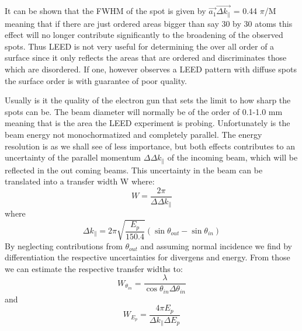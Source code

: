 \vspace{1cm}

 It can be shown that the FWHM of the spot is given by 
$\overrightarrow{a_1} \overrightarrow{\Delta k_{\parallel}}$ = 0.44 $\pi$/M meaning that if there are just ordered areas bigger than say 30 by 30 atoms this effect will no longer contribute significantly  to the  broadening of the observed spots. Thus LEED is not very useful for determining the over all order of a surface since it only reflects the areas that are ordered and discriminates those which are disordered. If one, however observes a LEED pattern with diffuse spots the surface order is with guarantee of poor quality.

Usually is it the quality of the electron gun that sets the limit to how sharp the spots can be. The beam diameter will normally be of the order of 0.1-1.0 mm meaning that is the area the LEED experiment is probing. Unfortunately is the beam energy not monochormatized and completely parallel. The energy resolution is as we shall see of less importance, but both effects contributes to an uncertainty of the parallel momentum $\Delta \Delta k_{\parallel}$  of the incoming beam, which will be reflected in the out coming beams. This uncertainty in the beam can be translated into a transfer width W where:
\begin{equation}
W = \frac{2\pi}{\Delta \Delta k_{\parallel}}
\end{equation} 
where 
\begin{equation}
\Delta k_{\parallel} = 2\pi \sqrt{\frac{E_p}{150.4}}(\sin{\theta_{out}}-\sin{\theta_{in}})
\end{equation} 
By neglecting contributions from $\theta_{out}$ and assuming normal incidence we find by differentiation the respective uncertainties for divergens and energy. From those we can estimate the respective transfer widths to:
\begin{equation}
W_{\theta_{in}} = \frac{\lambda}{\cos{\theta_{in}}\Delta\theta_{in}}
\end{equation}
and 
 \begin{equation}
W_{E_p} = \frac{4\pi E_p }{ \Delta k_{\parallel} \Delta E_p}
\end{equation}
